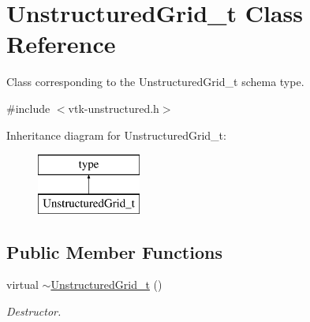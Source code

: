 \hypertarget{classUnstructuredGrid__t}{\section{Unstructured\+Grid\+\_\+t Class Reference}
\label{classUnstructuredGrid__t}
}


Class corresponding to the Unstructured\+Grid\+\_\+t schema type.  




{\ttfamily \#include $<$vtk-\/unstructured.\+h$>$}

Inheritance diagram for Unstructured\+Grid\+\_\+t\+:\begin{figure}[H]
\begin{center}
\leavevmode
\includegraphics[height=2.000000cm]{classUnstructuredGrid__t}
\end{center}
\end{figure}
\subsection*{Public Member Functions}
\begin{DoxyCompactItemize}
\item 
virtual \hyperlink{classUnstructuredGrid__t_a6fb9239ab1215edd7e7822a66d3af53c}{$\sim$\+Unstructured\+Grid\+\_\+t} ()
\begin{DoxyCompactList}\small\item\em Destructor. \end{DoxyCompactList}\end{DoxyCompactItemize}
